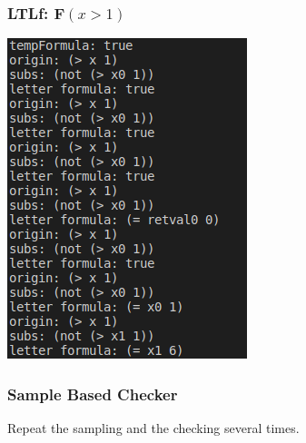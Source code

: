 \documentclass[11pt]{beamer}
\begin{document}
\begin{frame}\frametitle{LTLf: $\mathbf{F}(x > 1)$}

\begin{center}
\includegraphics[scale=0.6]{fx>1.png}
\end{center}

\end{frame}

\begin{frame}\frametitle{Sample Based Checker}

Repeat the sampling and the checking several times.

\end{frame}
\end{document}
